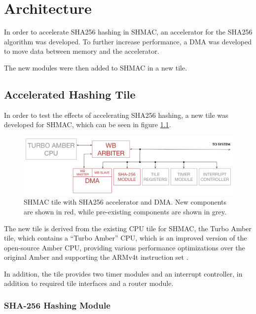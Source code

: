 \chapter{Architecture}
\label{cha:architecture}

In order to accelerate SHA256 hashing in SHMAC, an accelerator for the SHA256 algorithm
was developed. To further increase performance, a DMA was developed to move data between
memory and the accelerator.

The new modules were then added to SHMAC in a new tile.

\section{Accelerated Hashing Tile}
\label{sec:aht}

In order to test the effects of accelerating SHA256 hashing, a new tile was developed for
SHMAC, which can be seen in figure \ref{fig:SHA-Tile}.

\begin{figure}[htb]
    \centering
    \includegraphics[width=1.0\textwidth]{Figures/Tile/HashingTile}
    \caption{SHMAC tile with SHA256 accelerator and DMA. New components are shown in red, while pre-existing components are shown in grey.}
    \label{fig:SHA-Tile}
\end{figure}

The new tile is derived from the existing CPU tile for SHMAC, the Turbo Amber tile, which contains
a ``Turbo Amber'' CPU, which is an improved version of the open-source Amber CPU, providing various
performance optimizations over the original Amber and supporting the ARMv4t instruction set \cite{turboamber}.

In addition, the tile provides two timer modules and an interrupt controller, in addition to required
tile interfaces and a router module.

\subsection{SHA-256 Hashing Module}


